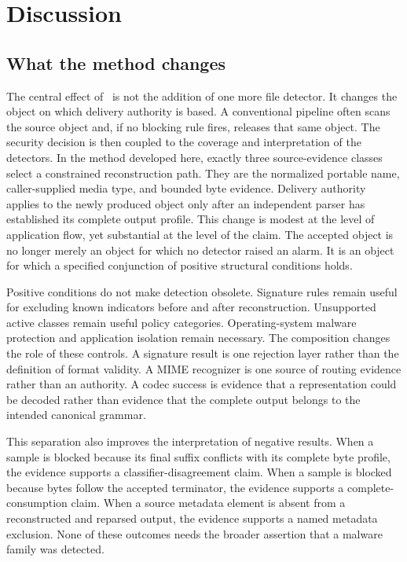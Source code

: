 \section{Discussion}
\label{sec:discussion}

\subsection{What the method changes}

The central effect of \AFD\ is not the addition of one more file detector. It
changes the object on which delivery authority is based. A conventional
pipeline often scans the source object and, if no blocking rule fires, releases
that same object. The security decision is then coupled to the coverage and
interpretation of the detectors. In the method developed here, exactly three
source-evidence classes select a constrained reconstruction path. They are the
normalized portable name, caller-supplied media type, and bounded byte evidence.
Delivery authority applies to the newly produced object only after an
independent parser has established its complete output profile. This change is
modest at the level of application flow, yet
substantial at the level of the claim. The accepted object is no longer merely
an object for which no detector raised an alarm. It is an object for which a
specified conjunction of positive structural conditions holds.

Positive conditions do not make detection obsolete. Signature rules remain
useful for excluding known indicators before and after reconstruction.
Unsupported active classes remain useful policy categories. Operating-system
malware protection and application isolation remain necessary. The composition
changes the role of these controls. A signature result is one rejection layer
rather than the definition of format validity. A MIME recognizer is one source
of routing evidence rather than an authority. A codec success is evidence that
a representation could be decoded rather than evidence that the complete
output belongs to the intended canonical grammar.

This separation also improves the interpretation of negative results. When a
sample is blocked because its final suffix conflicts with its complete byte
profile, the evidence supports a classifier-disagreement claim. When a sample
is blocked because bytes follow the accepted terminator, the evidence supports
a complete-consumption claim. When a source metadata element is absent from a
reconstructed and reparsed output, the evidence supports a named metadata
exclusion. None of these outcomes needs the broader assertion that a malware
family was detected.

